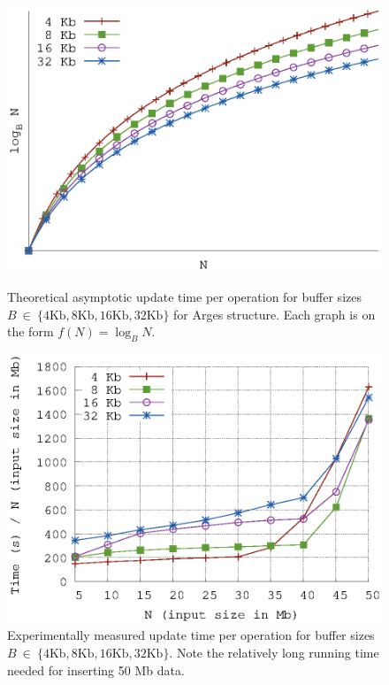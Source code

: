 \documentclass[twoside,11pt,openright]{report}
\begin{document}
\begin{figure}[h]
\centering
\begin{minipage}[t]{0.48\columnwidth}
  \centering
  \includegraphics[width=\linewidth]{../plots/arge_complexities/arge_complexity}
  \caption{Theoretical asymptotic update time per operation for buffer sizes $B~\in~\{4\text{Kb},8\text{Kb},16\text{Kb},32\text{Kb}\}$ for Arges structure. Each graph is on the form $f(N) = \log_B N$.}
  \label{fig:arge_buffer_size_theory}
\end{minipage}
\hfill
\begin{minipage}[t]{0.48\columnwidth}
  \centering
  \includegraphics[width=\linewidth]{../src/experiments/arge_buffer_size_experiment_results/2016-04-28.10_03_24/time}
  \caption{Experimentally measured update time per operation for buffer sizes $B~\in~\{4\text{Kb},8\text{Kb},16\text{Kb},32\text{Kb}\}$. Note the relatively long running time needed for inserting 50 Mb data.}
  \label{fig:arge_buffer_size_experiment}
\end{minipage}
\end{figure}
\end{document}
